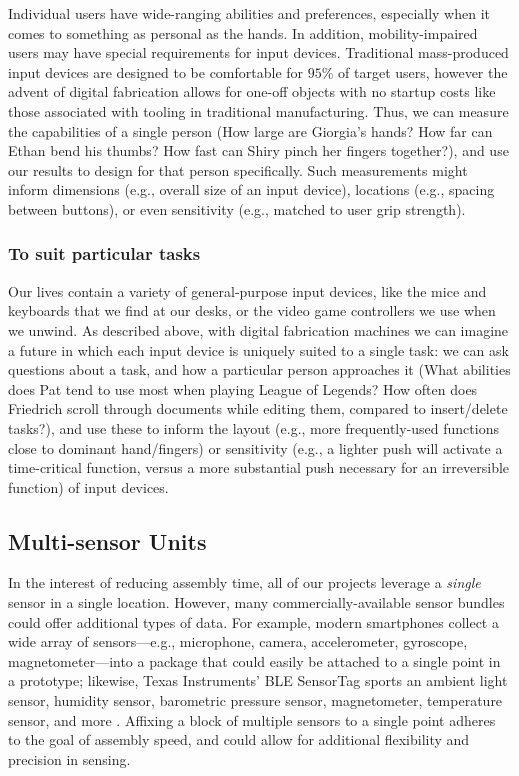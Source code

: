     Individual users have wide-ranging abilities and preferences, especially when it comes to something as personal as the hands. In addition, mobility-impaired users may have special requirements for input devices. Traditional mass-produced input devices are designed to be comfortable for $95$\% of target users, however the advent of digital fabrication allows for one-off objects with no startup costs like those associated with tooling in traditional manufacturing. Thus, we can measure the capabilities of a single person (How large are Giorgia's hands? How far can Ethan bend his thumbs? How fast can Shiry pinch her fingers together?), and use our results to design for that person specifically. Such measurements might inform dimensions (e.g., overall size of an input device), locations (e.g., spacing between buttons), or even sensitivity (e.g., matched to user grip strength).

    \subsubsection{To suit particular tasks}
    
    Our lives contain a variety of general-purpose input devices, like the mice and keyboards that we find at our desks, or the video game controllers we use when we unwind. As described above, with digital fabrication machines we can imagine a future in which each input device is uniquely suited to a single task: we can ask questions about a task, and how a particular person approaches it (What abilities does Pat tend to use most when playing League of Legends? How often does Friedrich scroll through documents while editing them, compared to insert/delete tasks?), and use these to inform the layout (e.g., more frequently-used functions close to dominant hand/fingers) or sensitivity (e.g., a lighter push will activate a time-critical function, versus a more substantial push necessary for an irreversible function) of input devices.
    
\subsection{Multi-sensor Units}

In the interest of reducing assembly time, all of our projects leverage a \emph{single} sensor in a single location. However, many commercially-available sensor bundles could offer additional types of data. For example, modern smartphones collect a wide array of sensors---e.g., microphone, camera, accelerometer, gyroscope, magnetometer---into a package that could easily be attached to a single point in a prototype; likewise, Texas Instruments' BLE SensorTag sports an ambient light sensor, humidity sensor, barometric pressure sensor, magnetometer, temperature sensor, and more \cite{ti-sensortag}. Affixing a block of multiple sensors to a single point adheres to the goal of assembly speed, and could allow for additional flexibility and precision in sensing.

